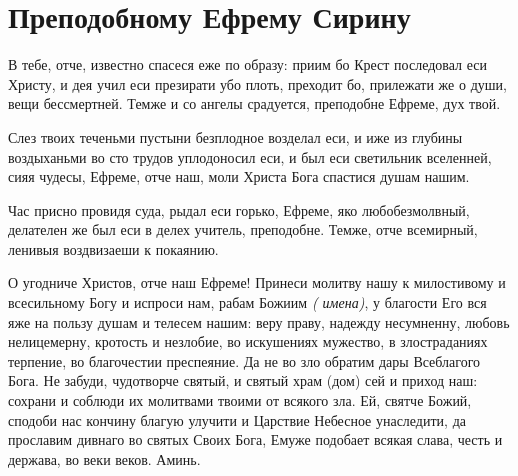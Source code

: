 \section{Преподобному Ефрему Сирину}\begin{mymulticols}


В тебе, отче, известно спасеся еже по образу: приим бо Крест последовал еси Христу, и дея учил еси презирати убо плоть, преходит бо, прилежати же о души, вещи бессмертней. Темже и со ангелы срадуется, преподобне Ефреме, дух твой.


Слез твоих теченьми пустыни безплодное возделал еси, и иже из глубины воздыханьми во сто трудов уплодоносил еси, и был еси светильник вселенней, сияя чудесы, Ефреме, отче наш, моли Христа Бога спастися душам нашим.


Час присно провидя суда, рыдал еси горько, Ефреме, яко любобезмолвный, делателен же был еси в делех учитель, преподобне. Темже, отче всемирный, ленивыя воздвизаеши к покаянию.


О угодниче Христов, отче наш Ефреме! Принеси молитву нашу к милостивому и всесильному Богу и испроси нам, рабам Божиим {\itshape( имена)}, у благости Его вся яже на пользу душам и телесем нашим: веру праву, надежду несумненну, любовь нелицемерну, кротость и незлобие, во искушениях мужество, в злостраданиях терпение, во благочестии преспеяние. Да не во зло обратим дары Всеблагого Бога. Не забуди, чудотворче святый, и святый храм (дом) сей и приход наш: сохрани и соблюди их молитвами твоими от всякого зла. Ей, святче Божий, сподоби нас кончину благую улучити и Царствие Небесное унаследити, да прославим дивнаго во святых Своих Бога, Емуже подобает всякая слава, честь и держава, во веки веков. Аминь.

\end{mymulticols}

\mychapterending


